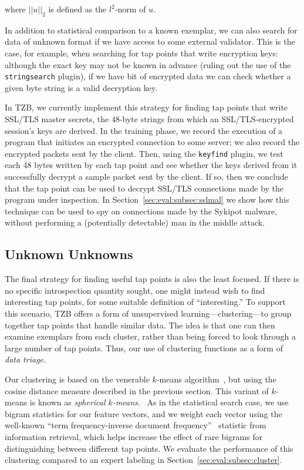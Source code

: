 \noindent where $||u||_2$ is defined as the $l^2$-norm of $u$.

In addition to statistical comparison to a known exemplar, we can also
search for data of unknown format if we have access to some external
validator. This is the case, for example, when searching for tap points
that write encryption keys: although the exact key may not be known in
advance (ruling out the use of the \texttt{stringsearch} plugin), if we
have bit of encrypted data we can check whether a given byte string is a
valid decryption key.

In TZB, we currently implement this strategy for finding tap points that
write SSL/TLS master secrets, the 48-byte strings from which an
SSL/TLS-encrypted session's keys are derived. In the training phase, we
record the execution of a program that initiates an encrypted connection
to some server; we also record the encrypted packets sent by the client.
Then, using the \texttt{keyfind} plugin, we test each 48 bytes written
by each tap point and see whether the keys derived from it successfully
decrypt a sample packet sent by the client. If so, then we conclude that
the tap point can be used to decrypt SSL/TLS connections made by the
program under inspection. In Section~\ref{sec:eval:subsec:sslmal} we show
how this technique can be used to spy on connections made by the Sykipot
malware, without performing a (potentially detectable) man in the middle
attack.

\subsection{Unknown Unknowns}

The final strategy for finding useful tap points is also the least
focused. If there is no specific introspection quantity sought, one
might instead wish to find interesting tap points, for some suitable
definition of ``interesting.'' To support this scenario, TZB offers a
form of unsupervised learning---clustering---to group together tap
points that handle similar data. The idea is that one can then examine
exemplars from each cluster, rather than being forced to look through a
large number of tap points. Thus, our use of clustering functions as a
form of \emph{data triage}.

Our clustering is based on the venerable $k$-means
algorithm~\cite{Steinhaus:1956kx}, but using the cosine distance measure
described in the previous section. This variant of $k$-means is known as
\emph{spherical $k$-means}.~\cite{Dhillon:2001fk} As in the statistical
search case, we use bigram statistics for our feature vectors, and we
weight each vector using the well-known ``term frequency-inverse
document frequency''~\cite{Sparck-Jones:1988uq} statistic from
information retrieval, which helps increase the effect of rare bigrams
for distinguishing between different tap points. We evaluate the
performance of this clustering compared to an expert labeling in
Section~\ref{sec:eval:subsec:cluster}.
